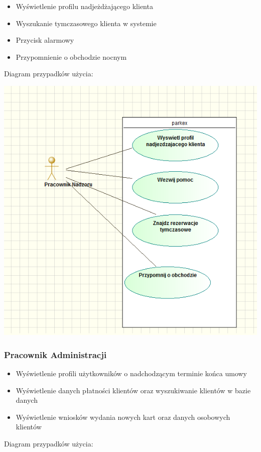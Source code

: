 \documentclass[paper=a4, fontsize=11pt]{scrartcl} %
\begin{document}
\begin{itemize}
\item Wyświetlenie profilu nadjeżdżającego klienta
\item Wyszukanie tymczasowego klienta w systemie
\item Przycisk alarmowy
\item Przypomnienie o obchodzie nocnym
\end{itemize}


Diagram przypadków użycia:

\includegraphics[scale=0.7]{pnad}

\subsubsection{Pracownik Administracji}

\begin{itemize}
\item Wyświetlenie profili użytkowników o nadchodzącym terminie końca umowy
\item Wyświetlenie danych płatności klientów oraz wyszukiwanie klientów w bazie danych
\item Wyświetlenie wniosków wydania nowych kart oraz danych osobowych klientów
\end{itemize}

Diagram przypadków użycia:
\end{document}
